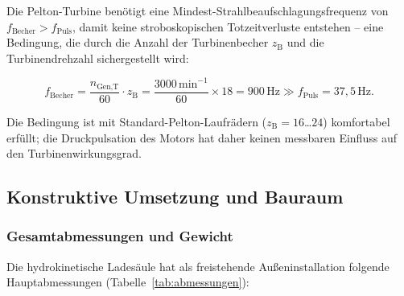 ﻿\documentclass[a4paper,12pt]{article}
\begin{document}
Die Pelton-Turbine benötigt eine Mindest-Strahlbeaufschlagungsfrequenz von
$f_\text{Becher} > f_\text{Puls}$, damit keine stroboskopischen
Totzeitverluste entstehen -- eine Bedingung, die durch die Anzahl der
Turbinenbecher $z_\text{B}$ und die Turbinendrehzahl sichergestellt wird:

\begin{equation}
  f_\text{Becher}
    = \frac{n_\text{Gen,T}}{60} \cdot z_\text{B}
    = \frac{3000\,\text{min}^{-1}}{60} \times 18
    = 900\,\text{Hz} \gg f_\text{Puls} = 37{,}5\,\text{Hz}.
  \label{eq:f_becher}
\end{equation}

Die Bedingung ist mit Standard-Pelton-Laufrädern ($z_\text{B} = 16$\ldots$24$)
komfortabel erfüllt; die Druckpulsation des Motors hat daher keinen messbaren
Einfluss auf den Turbinenwirkungsgrad.

\subsection{Konstruktive Umsetzung und Bauraum}

\subsubsection{Gesamtabmessungen und Gewicht}

Die hydrokinetische Ladesäule hat als freistehende Außeninstallation
folgende Hauptabmessungen (Tabelle~\ref{tab:abmessungen}):
\end{document}
